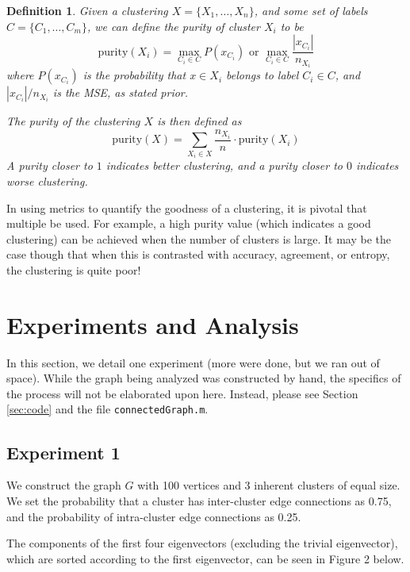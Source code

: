 \documentclass[11pt, letterpaper]{article}
\theoremstyle{perchance}
\newtheorem*{definition}{Definition}
\begin{document}
        \begin{definition}
            Given a clustering $X = \{X_1, \ldots, X_n\}$, and some set of labels $C = \{C_1, \ldots, C_m\}$, we can define the \emph{purity} of cluster $X_i$ to be
            \[\text{purity}(X_i) = \max_{C_i \in C} P(x_{C_i}) \text{ or } \max_{C_i \in C} \frac{|x_{C_i}|}{n_{X_i}}\]
            where $P(x_{C_i})$ is the probability that $x \in X_i$ belongs to label $C_i \in C$, and $|x_{C_i}| / n_{X_i}$ is the MSE, as stated prior.
    
            The purity of the clustering $X$ is then defined as
            \[\text{purity}(X) = \sum_{X_i \in X} \frac{n_{X_i}}{n} \cdot \text{purity}(X_i)\]
            A purity closer to $1$ indicates better clustering, and a purity closer to $0$ indicates worse clustering.
        \end{definition}
    
        In using metrics to quantify the goodness of a clustering, it is pivotal that multiple be used. For example, a high purity value (which indicates a good clustering) can be achieved when the number of clusters is large. It may be the case though that when this is contrasted with accuracy, agreement, or entropy, the clustering is quite poor!

\section{Experiments and Analysis}\label{sec:exp}

    In this section, we detail one experiment (more were done, but we ran out of space). While the graph being analyzed was constructed by hand, the specifics of the process will not be elaborated upon here. Instead, please see Section \ref{sec:code} and the file \texttt{connectedGraph.m}.

\subsection{Experiment 1}

    We construct the graph $G$ with 100 vertices and 3 inherent clusters of equal size. We set the probability that a cluster has inter-cluster edge connections as 0.75, and the probability of intra-cluster edge connections as 0.25. 

    The components of the first four eigenvectors (excluding the trivial eigenvector), which are sorted according to the first eigenvector, can be seen in Figure 2 below.
\end{document}
